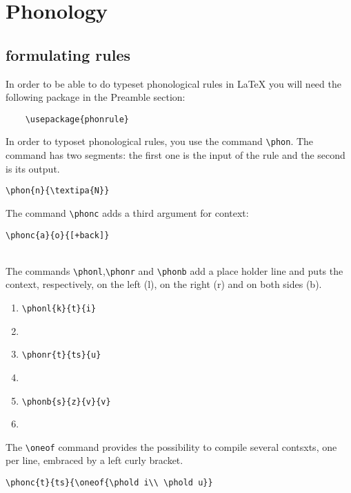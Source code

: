 \documentclass{article}
\begin{document}
\section{Phonology}
\subsection{formulating rules}
In order to be able to do typeset phonological rules in LaTeX you will need the following package in the Preamble section:
\begin{verbatim}
    \usepackage{phonrule}
\end{verbatim}

In order to typoset phonological rules, you use the command \verb|\phon|. The command has two segments: the first one is the input of the rule and the second is its output.
\begin{center}
    \verb|\phon{n}{\textipa{N}}|\\
    
\end{center}
The command \verb|\phonc| adds a third argument for context:
\begin{center}
    \verb|\phonc{a}{o}{[+back]}|\\
    
\end{center}
\\
The commands \verb|\phonl|,\verb|\phonr| and \verb|\phonb| add a place holder line and puts the context, respectively, on the left (l), on the right (r) and on both sides (b). \\
\begin{enumerate}
    \item \verb|\phonl{k}{t}{i}| 
    \item \space\space{}
    \item \verb|\phonr{t}{ts}{u}| 
    \item \space\space{}
    \item \verb|\phonb{s}{z}{v}{v}|
    \item \space\space{}
\end{enumerate}
    
The \verb|\oneof| command provides the possibility to compile several contsxts, one per line, embraced by a left curly bracket.\\
\begin{center}
    \verb|\phonc{t}{ts}{\oneof{\phold i\\ \phold u}}|\\
    
\end{center}
\end{document}
